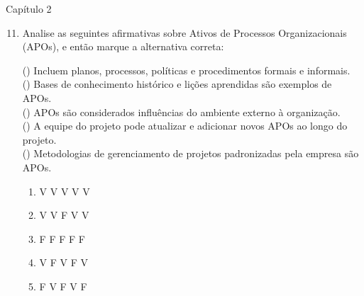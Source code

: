 \documentclass{beamer}
\begin{document}
\begin{frame}{Capítulo 2}
	\begin{enumerate}
		\setcounter{enumi}{10}
		\justifying
		\item Analise as seguintes afirmativas sobre Ativos de Processos Organizacionais (APOs), e então marque a alternativa correta:
		
		\vspace{10pt} \footnotesize
		(\hspace{10pt}) Incluem planos, processos, políticas e procedimentos formais e informais.\\
		(\hspace{10pt}) Bases de conhecimento histórico e lições aprendidas são exemplos de APOs.\\
		(\hspace{10pt}) APOs são considerados influências do ambiente externo à organização.\\
		(\hspace{10pt}) A equipe do projeto pode atualizar e adicionar novos APOs ao longo do projeto.\\
		(\hspace{10pt}) Metodologias de gerenciamento de projetos padronizadas pela empresa são APOs.
		
		\vspace{10pt} \normalsize
		\begin{enumerate}[a]
			\justifying
			\item V V V V V
			\item \alert<2>{V V F V V}
			\item F F F F F
			\item V F V F V
			\item F V F V F
		\end{enumerate}
	\end{enumerate}
\end{frame}
\end{document}
